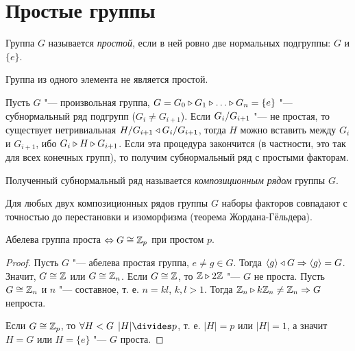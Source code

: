 \documentclass[main]{subfiles}
\begin{document}
\section{Простые группы}
\begin{definition}
  Группа $G$ называется \emph{простой}, если в ней ровно две нормальных
  подгруппы: $G$ и $\{ e \}$.
\end{definition}
\begin{remark}
  Группа из одного элемента не является простой.
\end{remark}

Пусть $G$ "--- произвольная группа,
$G = G_0 \NGS G_1 \NGS \dots \NGS G_n = \{ e \}$ "---
субнормальный ряд подгрупп ($G_i \ne G_{i + 1}$).
Если $\Factor{G_i}[G_{i + 1}]$ "--- не простая,
то существует нетривиальная
$\Factor{H}[G_{i + 1}] \NSG \Factor{G_i}[G_{i + 1}]$,
тогда $H$ можно вставить между $G_i$ и $G_{i + 1}$,
ибо $G_i \triangleright H \triangleright G_{i + 1}$.
Если эта процедура закончится
(в частности, это так для всех конечных групп),
то получим субнормальный
ряд с простыми факторам.

\begin{remark}
  Полученный субнормальный ряд называется \emph{композиционным рядом}
  группы $G$.
\end{remark}

Для любых двух композиционных рядов группы $G$ наборы факторов
совпадают с точностью до перестановки и изоморфизма
(теорема Жордана-Гёльдера).

\begin{proposition}
  Абелева группа проста $\Leftrightarrow G \cong \mathbb{Z}_p$ при простом $p$.
\end{proposition}
\begin{proof}
  Пусть $G$ "--- абелева простая группа, $e \ne g \in G$.
  Тогда $\langle g \rangle \triangleleft G \Rightarrow \langle g \rangle = G$.
  Значит, $G \cong \mathbb{Z}$ или $G \cong \mathbb{Z}_n$.
  Если $G \cong \mathbb{Z}$, то $\mathbb{Z} \triangleright 2\mathbb{Z}$ "--- $G$ не проста.
  Пусть $G \cong \mathbb{Z}_n$ и $n$ "--- составное, т. е. $n = kl$,
  $k, l > 1$.
  Тогда $\mathbb{Z}_n \triangleright k \mathbb{Z}_n \ne \mathbb{Z}_n
  \Rightarrow G$ непроста.

  Если $G \cong \mathbb{Z}_p$,
  то $\Forall{H < G} |H| \divides p$,
  т. е. $|H| = p$ или $|H| = 1$,
  а значит $H = G$ или $H = \{ e \}$ "--- $G$ проста.
\end{proof}
\end{document}
